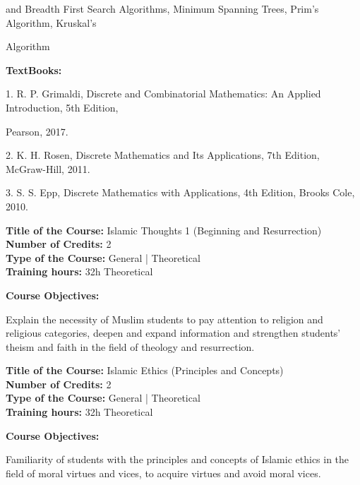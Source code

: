 \documentclass[12pt,a4paper]{article}
\begin{document}
and Breadth First Search Algorithms, Minimum Spanning Trees, Prim’s Algorithm, Kruskal’s\par
Algorithm\par\vspace{4pt}
\textbf{TextBooks:}\par\vspace{2pt}
1. R. P. Grimaldi, Discrete and Combinatorial Mathematics: An Applied Introduction, 5th Edition,\par
Pearson, 2017.\par
2. K. H. Rosen, Discrete Mathematics and Its Applications, 7th Edition, McGraw-Hill, 2011.\par
3. S. S. Epp, Discrete Mathematics with Applications, 4th Edition, Brooks Cole, 2010.\par
\vspace{4pt}

\newpage
\nopagebreak
\textbf{Title of the Course:} Islamic Thoughts 1 (Beginning and Resurrection)\\
\textbf{Number of Credits:} 2\\
\textbf{Type of the Course:} General | Theoretical\\
\textbf{Training hours:} 32h Theoretical\par\vspace{4pt}
\textbf{Course Objectives:}\par\vspace{2pt}
Explain the necessity of Muslim students to pay attention to religion and religious categories,
deepen and expand information and strengthen students' theism and faith in the field of theology
and resurrection.\par\vspace{4pt}

\par\vspace{14pt}
\nopagebreak
\textbf{Title of the Course:} Islamic Ethics (Principles and Concepts)\\
\textbf{Number of Credits:} 2\\
\textbf{Type of the Course:} General | Theoretical\\
\textbf{Training hours:} 32h Theoretical\par\vspace{4pt}
\textbf{Course Objectives:}\par\vspace{2pt}
Familiarity of students with the principles and concepts of Islamic ethics in the field of moral
virtues and vices, to acquire virtues and avoid moral vices.\par\vspace{4pt}
\end{document}
